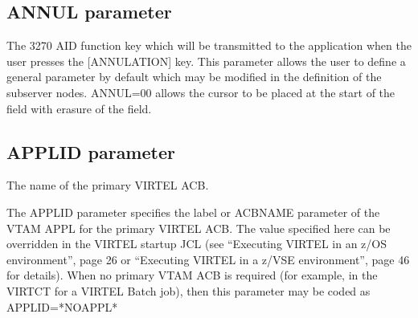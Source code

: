 \documentclass[letterpaper,10pt,english]{sphinxmanual}
\begin{document}
\ignorespaces 

\subsection{ANNUL parameter}
\label{\detokenize{Installation_Guide:annul-parameter}}\label{\detokenize{Installation_Guide:index-34}}
\begin{sphinxVerbatim}[commandchars=\\\{\}]
  
\end{sphinxVerbatim}

\sphinxAtStartPar
{} \sphinxhyphen{} The 3270 AID function key which will be transmitted to the application when the user presses the {[}ANNULATION{]} key. This parameter allows the user to define a general parameter by default which may be modified in the definition of the sub\sphinxhyphen{}server nodes.
ANNUL=00 allows the cursor to be placed at the start of the field with erasure of the field.

\ignorespaces 

\subsection{APPLID parameter}
\label{\detokenize{Installation_Guide:index-35}}\label{\detokenize{Installation_Guide:id6}}
\begin{sphinxVerbatim}[commandchars=\\\{\}]
 
\end{sphinxVerbatim}

\sphinxAtStartPar
{} \sphinxhyphen{} The name of the primary VIRTEL ACB.

\sphinxAtStartPar
The APPLID parameter specifies the label or ACBNAME parameter of the VTAM APPL for the primary VIRTEL ACB. The value specified here can be overridden in the VIRTEL startup JCL (see “Executing VIRTEL in an z/OS environment”, page 26 or “Executing VIRTEL in a z/VSE environment”, page 46 for details). When no primary VTAM ACB is required (for example, in the VIRTCT for a VIRTEL Batch job), then this parameter may be coded as APPLID=*NOAPPL*
\end{document}
